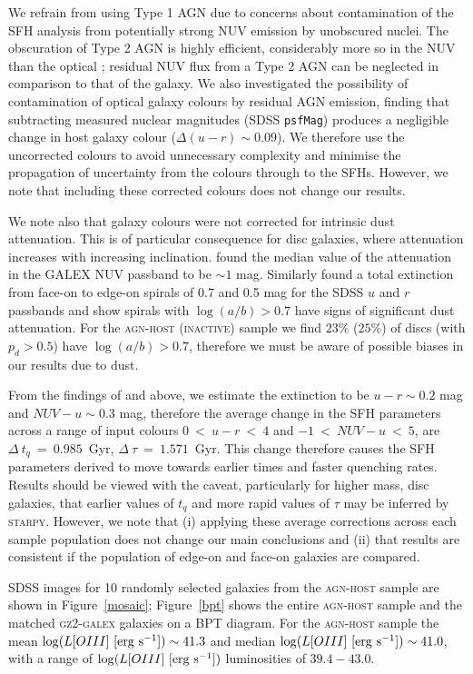 \documentclass[useAMS,usenatbib]{mn2e}
\def\changed    {\color{nc} }
\def\secondchange    {\color{srv} }
\def\newref    {\color{new} }
\begin{document}
{\changed We refrain from using Type 1 AGN due to concerns about contamination of the SFH analysis from potentially strong NUV emission by unobscured nuclei. The obscuration of Type 2 AGN is highly efficient, considerably more so in the NUV than the optical \citep{Simmons11}; residual NUV flux from a Type 2 AGN can be neglected in comparison to that of the galaxy. We also investigated the possibility of contamination of optical galaxy colours by residual AGN emission, finding that subtracting measured nuclear magnitudes (SDSS {\tt psfMag}) produces a negligible change in host galaxy colour ($\Delta(u-r) \sim 0.09$)}. We therefore use the uncorrected colours to avoid unnecessary complexity and minimise the propagation of uncertainty from the colours through to the SFHs. {\changed However, we note that including these corrected colours does not change our results.}  

{\secondchange We note also that galaxy colours were not corrected for intrinsic dust attenuation. This is of particular consequence for disc galaxies, where attenuation increases with increasing inclination. \cite{Buat05} found the median value of the attenuation in the GALEX NUV passband to be $\sim 1$ mag. Similarly \cite{Masters10} found a total extinction from face-on to edge-on spirals of 0.7 and 0.5 mag for the SDSS $u$ and $r$ passbands and show spirals with $\log(a/b) > 0.7$ have signs of significant dust attenuation. For the \textsc{agn-host} (\textsc{inactive}) sample we find $23\%$ ($25\%$) of discs (with $p_d > 0.5$) have $\log(a/b) > 0.7$, therefore we must be aware of possible biases in our results due to dust. 

From the findings of \cite{Masters10} and \cite{Buat05} above, we estimate the extinction to be $u-r \sim 0.2$ mag and $NUV-u \sim 0.3$ mag, therefore the average change in the SFH parameters across a range of input colours $0 ~<~u-r~<~4$ and $-1~<~NUV-u~<~5$,  are $\Delta~t_q~=~0.985$~Gyr, $\Delta~\tau~=~1.571$~Gyr. This change therefore causes the SFH parameters derived to move towards earlier times and faster quenching rates. Results should be viewed with the caveat, particularly for higher mass, disc galaxies, that earlier values of $t_q$ and more rapid values of $\tau$ may be inferred by \textsc{starpy}. However, we note that (i) applying these average corrections across each sample population does not change our main conclusions and {\newref (ii) that results are consistent if the population of edge-on and face-on galaxies are compared.}}

SDSS images for 10 randomly selected galaxies from the \textsc{agn-host} sample are shown in Figure~\ref{mosaic}; Figure~\ref{bpt} shows the entire \textsc{agn-host} sample and the matched \textsc{gz2-galex} galaxies on a BPT diagram.  For the \textsc{agn-host} sample the mean $\log (L[OIII] ~[\rm{erg~s^{-1}}]) \sim 41.3$ and median $\log (L[OIII] ~[\rm{erg~s^{-1}}]) \sim 41.0$, with a range of $\log (L[OIII] ~[\rm{erg~s^{-1}}])$ luminosities of $39.4-43.0$. 
\end{document}
